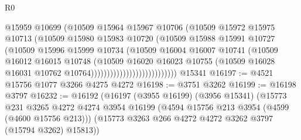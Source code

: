\begin{lexlean}{R0}
\begin{coremodule}
                                        @15959
                                        @10699
                                        (@10509
                                          @15964
                                          @15967
                                          @10706
                                          (@10509
                                            @15972
                                            @15975
                                            @10713
                                            (@10509
                                              @15980
                                              @15983
                                              @10720
                                              (@10509
                                                @15988
                                                @15991
                                                @10727
                                                (@10509
                                                  @15996
                                                  @15999
                                                  @10734
                                                  (@10509
                                                    @16004
                                                    @16007
                                                    @10741
                                                    (@10509
                                                      @16012
                                                      @16015
                                                      @10748
                                                      (@10509
                                                        @16020
                                                        @16023
                                                        @10755
                                                        (@10509
                                                          @16028
                                                          @16031
                                                          @10762
                                                          @10764)))))))))))))))))))))))))))
    @15341
@16197 := @4521 @15756 @1077 @3266 @4275 @4272
@16198 := @3751 @3262
@16199 := @16198 @3797
@16232 := @16192
    (@16197
      (@3955 @16199)
      (@3956 @15341)
      (@15773
        @231
        @3265
        @4272
        @4274
        @3954
        @16199
        (@4594 @15756 @213 @3954 (@4599 (@4600 @15756 @213)))
        (@15773 @3263 @266 @4272 @4272 @3262 @3797 (@15794 @3262) @15813))

\end{coremodule}
\end{lexlean}

